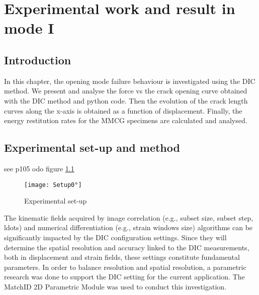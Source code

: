 \chapter{Experimental work and result in mode I}
\label{Chapter3}

\section{Introduction}

In this chapter, the opening mode failure behaviour is investigated using the DIC method. We present and analyse the force vs the crack opening curve obtained with the DIC method and python code.  Then the evolution of the crack length curves along the x-axis is obtained as a function of displacement. Finally, the energy restitution rates for the MMCG specimens are calculated and analysed.

\section{Experimental set-up and method}

see p105 odo
figure \ref{fig:Setup0°}



\begin{figure}[htp]
	\centering
	\texttt{[image: Setup0°]}
	\caption{Experimental set-up}
	\label{fig:Setup0°}
\end{figure}

The kinematic fields acquired by image correlation (e.g., subset size, subset step, ldots) and numerical differentiation (e.g., strain windows size) algorithms can be significantly impacted by the DIC configuration settings. Since they will determine the spatial resolution and accuracy linked to the DIC measurements, both in displacement and strain fields, these settings constitute fundamental parameters.  In order to balance resolution and spatial resolution, a parametric research was done to support the DIC setting for the current application. The MatchID 2D Parametric Module was used to conduct this investigation.

